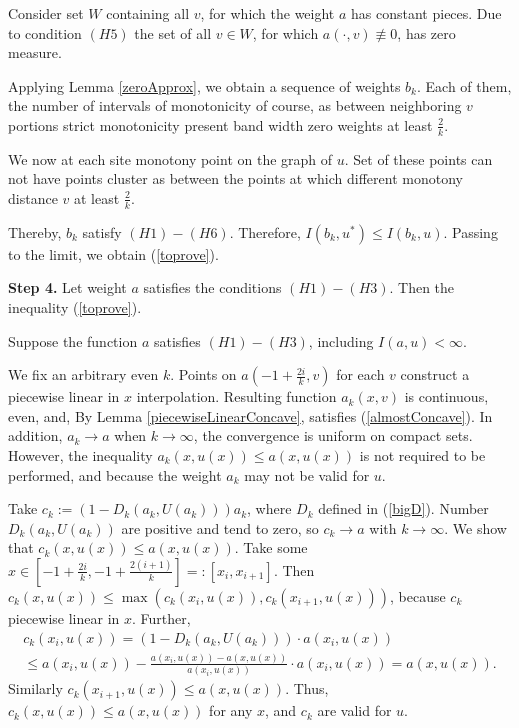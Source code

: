 Consider set $W$ containing all $v$, for which the weight $a$ has constant pieces.
Due to condition $(H5)$ the set of all $v \in W$, for which $a(\cdot, v) \not\equiv 0$,
has zero measure.

Applying Lemma \ref{zeroApprox}, we obtain a sequence of weights $b_k$.
Each of them, the number of intervals of monotonicity of course,
as between neighboring $v$ portions strict monotonicity
present band width zero weights at least $\frac{2}{k}$.

We now at each site monotony point on the graph of $u$.
Set of these points can not have points cluster
as between the points at which different monotony
distance $v$ at least $\frac{2}{k}$.

Thereby, $b_k$ satisfy $(H1)-(H6)$. Therefore, $I(b_k, u^*) \le I(b_k, u)$.
Passing to the limit, we obtain (\ref{toprove}).

\bigskip
{\bf Step 4.} Let weight $a$ satisfies the conditions $(H1)-(H3)$.
Then the inequality (\ref{toprove}).

Suppose the function $a$ satisfies $(H1)-(H3)$, including $I(a, u) < \infty$.

We fix an arbitrary even $k$.
Points on $a(-1 + \frac{2i}{k}, v)$ for each $v$ construct a piecewise linear in $x$ interpolation.
Resulting function $a_k(x, v)$ is continuous, even, and,
By Lemma \ref{piecewiseLinearConcave}, satisfies
(\ref{almostConcave}).
In addition, $a_k \to a$ when $k \to \infty$,
the convergence is uniform on compact sets.
However, the inequality $a_k(x, u(x)) \le a(x, u(x))$ is not required to be performed,
and because the weight $a_k$ may not be valid for $u$.

Take $c_k := (1 - D_k(a_k, U(a_k))) a_k$, where $D_k$ defined in (\ref{bigD}).
Number $D_k(a_k, U(a_k))$ are positive and tend to zero, so $c_k \to a$ with $k \to \infty$.
We show that $c_k(x, u(x)) \le a(x, u(x))$.
Take some
$x \in [-1 + \frac{2i}{k}, -1 + \frac{2(i + 1)}{k}] =: [x_i, x_{i + 1}]$.
Then $c_k(x, u(x)) \le \max( c_k(x_i, u(x)), c_k(x_{i + 1}, u(x)) )$, because
$c_k$ piecewise linear in $x$. Further,
\begin{multline*}
c_k (x_i, u (x)) = ( 1 - D_k (a_k, U (a_k))) \cdot a (x_i, u (x)) \\
\le a (x_i, u (x)) - \frac{a (x_i, u (x)) - a (x, u (x))}{a (x_i, u (x))} \cdot a ( x_i, u (x)) = a (x, u (x)).
\end{multline*}
Similarly $c_k(x_{i + 1}, u(x)) \le a(x, u(x))$.
Thus, $c_k(x, u(x)) \le a(x, u(x))$ for any $x$, and $c_k$ are valid for $u$.

